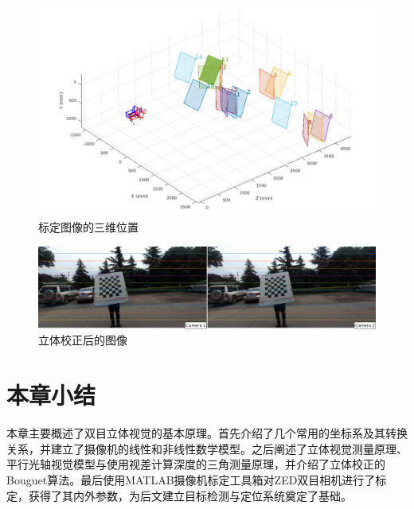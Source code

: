 \begin{figure}[!htb] %
	\centering
	\includegraphics[width=5in]{figures/2_2_extrinsics}
	\caption{标定图像的三维位置}\label{fig:2_2_extrinsics}
\end{figure}

\begin{figure}[!htb] %
	\centering
	\includegraphics[width=6in]{figures/2_2_rectified_image}
	\caption{立体校正后的图像}\label{fig:2_2_rectified_image}
\end{figure}



\section{本章小结}
本章主要概述了双目立体视觉的基本原理。首先介绍了几个常用的坐标系及其转换关系，并建立了摄像机的线性和非线性数学模型。之后阐述了立体视觉测量原理、平行光轴视觉模型与使用视差计算深度的三角测量原理，并介绍了立体校正的Bouguet算法。最后使用MATLAB摄像机标定工具箱对ZED双目相机进行了标定，获得了其内外参数，为后文建立目标检测与定位系统奠定了基础。









